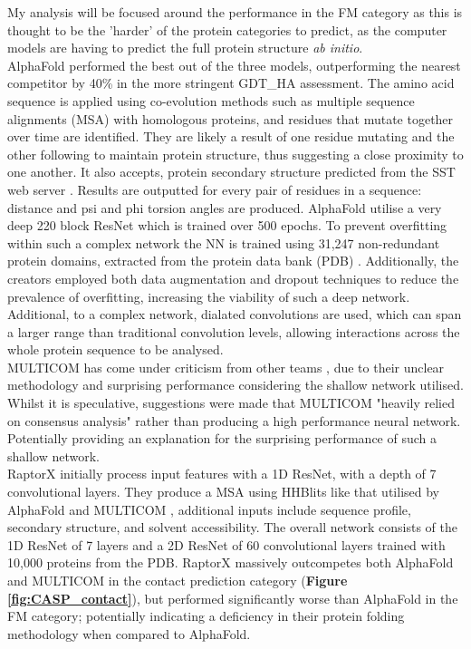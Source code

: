 My analysis will be focused around the performance in the FM category as this is thought to be the 'harder' of the protein categories to predict, as the computer models are having to predict the full protein structure \emph{ab initio}. 
\\[12pt]
AlphaFold \cite{seniorImprovedProteinStructure2020} performed the best out of the three models, outperforming the nearest competitor by 40\% in the more stringent GDT\_HA assessment. The amino acid sequence is applied using co-evolution methods such as multiple sequence alignments (MSA) with homologous proteins, and residues that mutate together over time are identified. They are likely a result of one residue mutating and the other following to maintain protein structure, thus suggesting a close proximity to one another. It also accepts, protein secondary structure predicted from the SST web server \cite{konagurthuMinimumMessageLength2012}. Results are outputted for every pair of residues in a sequence: distance and psi and phi torsion angles are produced. AlphaFold utilise a very deep 220 block ResNet which is trained over 500 epochs. To prevent overfitting within such a complex network the NN is trained using 31,247 non-redundant protein domains, extracted from the protein data bank (PDB) \cite{bermanProteinDataBank2000a}. Additionally, the creators employed both data augmentation and dropout techniques to reduce the prevalence of overfitting, increasing the viability of such a deep network. Additional, to a complex network, dialated convolutions \cite{yuMultiScaleContextAggregation2016} are used, which can span a larger range than traditional convolution levels, allowing interactions across the whole protein sequence to be analysed.
\\[12pt]
MULTICOM has come under criticism from other teams \cite{xuAnalysisDistancebasedProtein2019}, due to their unclear methodology and surprising performance considering the shallow network utilised. Whilst it is speculative, suggestions were made that MULTICOM "heavily relied on consensus analysis" \cite{xuAnalysisDistancebasedProtein2019} rather than producing a high performance neural network. Potentially providing an explanation for the surprising performance of such a shallow network.
\\[12pt]
RaptorX \cite{xuAnalysisDistancebasedProtein2019} initially process input features with a 1D ResNet, with a depth of 7 convolutional layers. They produce a MSA using HHBlits like that utilised by AlphaFold and MULTICOM  \cite{remmertHHblitsLightningfastIterative2012}, additional inputs include sequence profile, secondary structure, and solvent accessibility. The overall network consists of the 1D ResNet of 7 layers and a 2D ResNet of 60 convolutional layers trained with 10,000 proteins from the PDB. RaptorX massively outcompetes both AlphaFold and MULTICOM in the contact prediction category (\textbf{Figure \ref{fig:CASP_contact}}), but performed significantly worse than AlphaFold in the FM category; potentially indicating a deficiency in their protein folding methodology when compared to AlphaFold.






